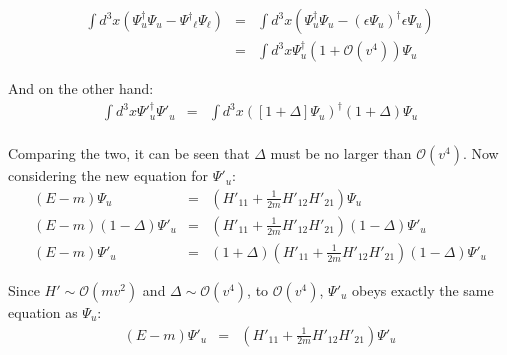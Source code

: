 \begin{eqnarray*}
\int d^3 x (\Psi_u^\dagger \Psi_u - {\Psi^\dagger}_\ell \Psi_\ell)  
	&=& \int d^3 x (\Psi_u^\dagger \Psi_u - (\epsilon {\Psi_u})^\dagger \epsilon \Psi_u) \\
	&=& \int d^3 x \Psi_u^\dagger (1 + \mathcal{O}(v^4)) \Psi_u
\end{eqnarray*}

And on the other hand:
\begin{eqnarray*}
\int d^3 x {\Psi'}_u^\dagger \Psi'_u 
	&=& \int d^3 x ([1 + \Delta]\Psi_u)^\dagger (1+\Delta)\Psi_u \\
\end{eqnarray*}

Comparing the two, it can be seen that $\Delta$ must be no larger than $\mathcal{O}(v^4)$.  Now considering the new equation for $\Psi'_u$:
\begin{eqnarray*}
(E -m)\Psi_u 	
	&=&	\left(H'_{11} +  \frac{1}{2m}H'_{12} H'_{21} \right) \Psi_u\\
(E-m)(1-\Delta)\Psi'_u 
	&=&	\left(H'_{11} +  \frac{1}{2m}H'_{12} H'_{21} \right) (1-\Delta)\Psi'_u\\
(E-m)\Psi'_u 
	&=&	(1 + \Delta)\left(H'_{11} +  \frac{1}{2m}H'_{12} H'_{21} \right) (1-\Delta)\Psi'_u
\end{eqnarray*}

Since $H' \sim \mathcal{O}(mv^2)$ and $\Delta \sim \mathcal{O}(v^4)$, to $\mathcal{O}(v^4)$, $\Psi'_u$ obeys exactly the same equation as $\Psi_u$:
\begin{eqnarray*}
(E -m)\Psi'_u 	
	&=&  \left ( H'_{11} +  \frac{1}{2m} H'_{12} H'_{21}  \right ) \Psi'_u \\
\end{eqnarray*}



